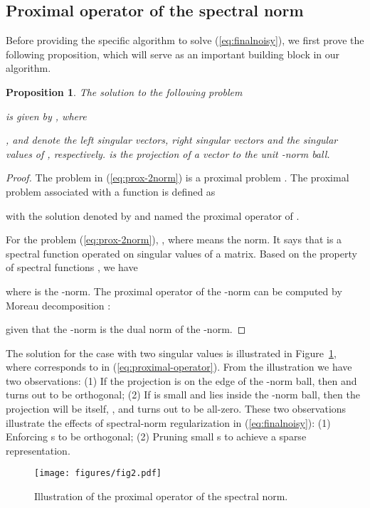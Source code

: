 \documentclass[10pt,journal,cspaper,compsoc]{IEEEtran}
\newcommand{\refEq}[1]{(\ref{#1})}
\newcommand{\refFig}[1]{Figure~\ref{#1}}
\newtheorem{proposition}{Proposition}
\begin{document}
\subsection{Proximal operator of the spectral norm}\label{sec:proximal}

Before providing the specific algorithm to solve \refEq{eq:finalnoisy}, we first prove the following proposition, which will serve as an important building block in our algorithm.
\begin{proposition}\label{prop:prox2norm}
The solution to the following problem

is given by , where

,  and  denote the left singular vectors, right singular vectors and the singular values of , respectively.  is the projection of a vector to the unit -norm ball.
\end{proposition}

\begin{proof}
The problem in \refEq{eq:prox-2norm} is a proximal problem \cite{parikh2013proximal}. The proximal problem associated with a function  is defined as

with the solution denoted by  and named the proximal operator of .

For the problem \refEq{eq:prox-2norm}, , where  means the  norm. It says that  is a spectral function operated on singular values of a matrix. Based on the property of spectral functions \cite[Section 6.7.2]{parikh2013proximal}, we have

where  is the -norm. The proximal operator of the -norm can be computed by Moreau decomposition \cite[Section 6.5]{parikh2013proximal}:

given that the -norm is the dual norm of the -norm.
\end{proof}

The solution for the case with two singular values is illustrated in \refFig{fig:proximal}, where  corresponds to  in \refEq{eq:proximal-operator}. From the illustration we have two observations: (1) If the projection is on the edge of the -norm ball, then  and  turns out to be orthogonal; (2) If  is small and lies inside the -norm ball, then the projection will be itself, , and  turns out to be all-zero. These two observations illustrate the effects of spectral-norm regularization in \refEq{eq:finalnoisy}: (1) Enforcing s to be orthogonal; (2) Pruning small s to achieve a sparse representation.

\begin{figure}
  \centering
\texttt{[image: figures/fig2.pdf]}\\
  \caption{Illustration of the proximal operator of the spectral norm.}\label{fig:proximal}
\end{figure}
\end{document}
